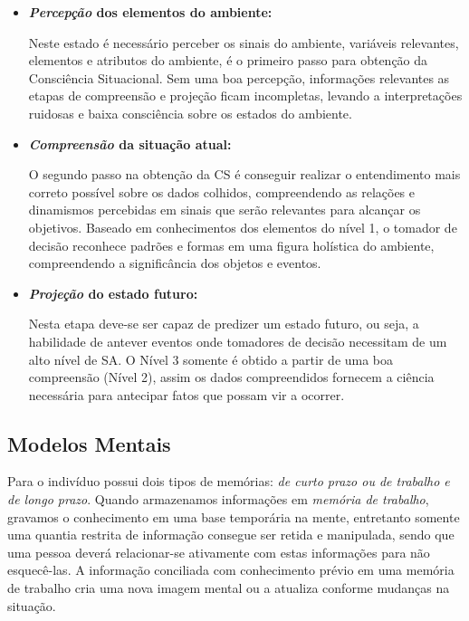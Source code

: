 \documentclass[12pt]{article}
\begin{document}
\begin{itemize}
		
	\item \textbf{\textit{Percepção} dos elementos do ambiente:}
	
	Neste estado é necessário perceber os sinais do ambiente, variáveis relevantes, elementos e atributos do ambiente, é o primeiro passo para obtenção da Consciência Situacional. Sem uma boa percepção, informações relevantes as etapas de compreensão e projeção ficam incompletas, levando a interpretações ruidosas e baixa consciência sobre os estados do ambiente.
	
	\item  \textbf{\textit{Compreensão} da situação atual:}
	
	O segundo passo na obtenção da CS é conseguir realizar o entendimento mais correto possível sobre os dados colhidos, compreendendo as relações e dinamismos percebidas em sinais que serão relevantes para alcançar os objetivos. Baseado em conhecimentos dos elementos do nível 1, o tomador de decisão reconhece padrões e formas em uma figura holística do ambiente, compreendendo a significância dos objetos e eventos.	
	
	\item \textbf{\textit{Projeção} do estado futuro:}
	
	Nesta etapa deve-se ser capaz de predizer um estado futuro, ou seja, a habilidade de antever eventos onde tomadores de decisão necessitam de um alto nível de SA. O Nível 3 somente é obtido a partir de uma boa compreensão (Nível 2), assim os dados compreendidos fornecem a ciência necessária para antecipar fatos que possam vir a ocorrer.
	
\end{itemize}

\subsection{Modelos Mentais}

Para \cite{Endsley2012} o indivíduo  possui dois tipos de memórias: \textit{de curto prazo ou de trabalho e de longo prazo}. Quando armazenamos informações em \textit{memória de trabalho}, gravamos o conhecimento em uma base temporária na mente, entretanto somente uma quantia restrita de informação consegue ser retida e manipulada, sendo que uma pessoa deverá relacionar-se ativamente com estas informações para não esquecê-las. A informação conciliada com conhecimento prévio em uma memória de trabalho cria uma nova imagem mental ou a atualiza conforme mudanças na situação. 	
\end{document}
